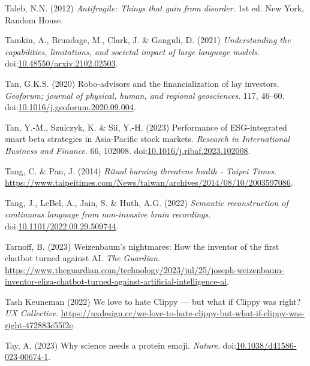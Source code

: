 \documentclass[
  letterpaper,
  DIV=11,
  numbers=noendperiod]{scrartcl}
\newlength{\cslhangindent}
\newenvironment{CSLReferences}[2] %
 {\begin{list}{}{%
  \setlength{\itemindent}{0pt}
  \setlength{\leftmargin}{0pt}
  \setlength{\parsep}{0pt}
  \ifodd #1
   \setlength{\leftmargin}{\cslhangindent}
   \setlength{\itemindent}{-1\cslhangindent}
  \fi
  \setlength{\itemsep}{#2\baselineskip}}}
 {\end{list}}
\begin{document}
\begin{CSLReferences}{0}{1}
Taleb, N.N. (2012) \emph{Antifragile: Things that gain from disorder}.
1st ed. New York, Random House.

Tamkin, A., Brundage, M., Clark, J. \& Ganguli, D. (2021)
\emph{Understanding the capabilities, limitations, and societal impact
of large language models}.
doi:\href{https://doi.org/10.48550/arxiv.2102.02503}{10.48550/arxiv.2102.02503}.

Tan, G.K.S. (2020) Robo-advisors and the financialization of lay
investors. \emph{Geoforum; journal of physical, human, and regional
geosciences}. 117, 46--60.
doi:\href{https://doi.org/10.1016/j.geoforum.2020.09.004}{10.1016/j.geoforum.2020.09.004}.

Tan, Y.-M., Szulczyk, K. \& Sii, Y.-H. (2023) Performance of
{ESG-integrated} smart beta strategies in {Asia-Pacific} stock markets.
\emph{Research in International Business and Finance}. 66, 102008.
doi:\href{https://doi.org/10.1016/j.ribaf.2023.102008}{10.1016/j.ribaf.2023.102008}.

Tang, C. \& Pan, J. (2014) \emph{Ritual burning threatens health -
{Taipei Times}}.
\url{https://www.taipeitimes.com/News/taiwan/archives/2014/08/10/2003597086}.

Tang, J., LeBel, A., Jain, S. \& Huth, A.G. (2022) \emph{Semantic
reconstruction of continuous language from non-invasive brain
recordings}.
doi:\href{https://doi.org/10.1101/2022.09.29.509744}{10.1101/2022.09.29.509744}.

Tarnoff, B. (2023) Weizenbaum's nightmares: How the inventor of the
first chatbot turned against {AI}. \emph{The Guardian}.
\url{https://www.theguardian.com/technology/2023/jul/25/joseph-weizenbaum-inventor-eliza-chatbot-turned-against-artificial-intelligence-ai}.

Tash Keuneman (2022) We love to hate {Clippy} --- but what if {Clippy}
was right? \emph{UX Collective}.
\url{https://uxdesign.cc/we-love-to-hate-clippy-but-what-if-clippy-was-right-472883c55f2e}.

Tay, A. (2023) Why science needs a protein emoji. \emph{Nature}.
doi:\href{https://doi.org/10.1038/d41586-023-00674-1}{10.1038/d41586-023-00674-1}.


\end{CSLReferences}
\end{document}
